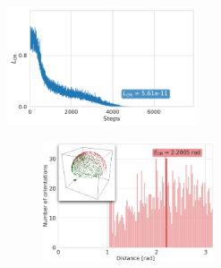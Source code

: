 \begin{figure}[ht!]
    \begin{minipage}[t]{0.34\linewidth}
        \centering
        \includegraphics[height=3.5cm]{figures/5a1a_quartercov_uniformS2_perfect_ar_aa}
        \caption{%
            Example of perfect orientation recovery (for \texttt{5a1a}).
            The loss $L_\text{OR}$  converges to zero when the distance estimation is perfect, \ie, $\widehat{d_p}(\p_i, \p_j) = d_q(q_i, q_j)$.
        }\label{fig:5j0n-orientation-recovery-loss}
    \end{minipage}
    \hfill
    \begin{minipage}[t]{0.64\linewidth}
        \begin{subfigure}[t]{0.48\linewidth}
            \centering
            \includegraphics[height=3.5cm]{figures/BeforeAA.pdf}

\end{subfigure}
\end{minipage}
\end{figure}
